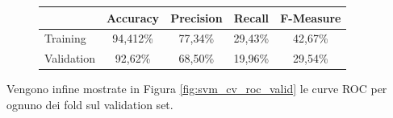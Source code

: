 \begin{figure}[H]
	\centering
	\begin{tabular}{lcccc}
		\toprule
		& \textbf{Accuracy} & \textbf{Precision} & \textbf{Recall} & 
		\textbf{F-Measure}  \\
		\midrule
		Training	&  94,412\% & 77,34\% & 29,43\%	& 42,67\%  	\\ 
		Validation	&  92,62\% & 68,50\% & 19,96\%	& 29,54\%	\\ 
		\bottomrule
	\end{tabular}
	\label{tab:svm_cv_performance}
\end{figure}

Vengono infine mostrate in Figura \ref{fig:svm_cv_roc_valid} le curve ROC per ognuno dei fold sul 
validation set.

